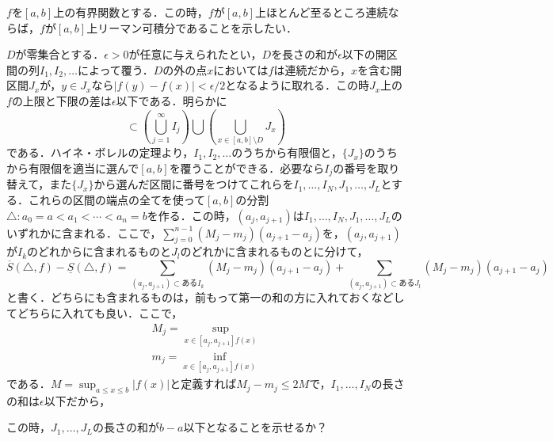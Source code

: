 \documentclass[12pt]{jarticle}
\numberwithin{equation}{section}    %
\numberwithin{figure}{section}      %
\numberwithin{table}{section}      %
\begin{document}
$f$を$[a, b]$上の有界関数とする．この時，$f$が$[a, b]$上ほとんど至るところ連続ならば，$f$が$[a, b]$上リーマン可積分であることを示したい．

$D$が零集合とする．$\epsilon > 0$が任意に与えられたとい，$D$を長さの和が$\epsilon$以下の開区間の列$I_{1}, I_{2}, \ldots$によって覆う．$D$の外の点$x$においては$f$は連続だから，$x$を含む開区間$J_{x}$が，$y \in J_{x}$なら$|f(y) - f(x)| < \epsilon / 2$となるように取れる．この時$J_{x}$上の$f$の上限と下限の差は$\epsilon$以下である．明らかに
\begin{equation}
    [a, b] \subset \left(\bigcup_{j = 1}^{\infty} I_{j}\right) \bigcup \left(\bigcup_{x \in [a, b] \setminus D} J_{x}\right)
\end{equation}
である．ハイネ・ボレルの定理より，$I_{1}, I_{2}, \ldots$のうちから有限個と，$\{J_{x}\}$のうちから有限個を適当に選んで$[a, b]$を覆うことができる．必要なら$I_{j}$の番号を取り替えて，また$\{J_{x}\}$から選んだ区間に番号をつけてこれらを$I_{1}, \ldots, I_{N}, J_{1}, \ldots, J_{L}$とする．これらの区間の端点の全てを使って$[a, b]$の分割$\triangle: a_{0} = a < a_{1} < \cdots < a_{n} = b$を作る．この時，$(a_{j}, a_{j + 1})$は$I_{1}, \ldots, I_{N}, J_{1}, \ldots, J_{L}$のいずれかに含まれる．ここで，$\sum_{j = 0}^{n - 1}(M_{j} - m_{j})(a_{j + 1} - a_{j})$を，$(a_{j}, a_{j + 1})$が$I_{k}$のどれからに含まれるものと$J_{l}$のどれかに含まれるものとに分けて，
\begin{equation}
    \overline{S}(\triangle, f) - \underline{S}(\triangle, f) = \sum_{(a_{j}, a_{j + 1}) \subset あるI_{k}} (M_{j} - m_{j})(a_{j + 1} - a_{j}) + \sum_{(a_{j}, a_{j + 1}) \subset あるJ_{l}} (M_{j} - m_{j})(a_{j + 1} - a_{j})
\end{equation}
と書く．どちらにも含まれるものは，前もって第一の和の方に入れておくなどしてどちらに入れても良い．ここで，
\begin{gather}
    M_{j} = \sup_{x \in [a_{j}, a_{j + 1}] f(x)} \\
    m_{j} = \inf_{x \in [a_{j}, a_{j + 1}] f(x)}
\end{gather}
である．$M = \sup_{a \le x \le b} |f(x)|$と定義すれば$M_{j} - m_{j} \le 2M$で，$I_{1}, \ldots, I_{N}$の長さの和は$\epsilon$以下だから，

この時，$J_{1}, \ldots, J_{L}$の長さの和が$b - a$以下となることを示せるか？
\end{document}
